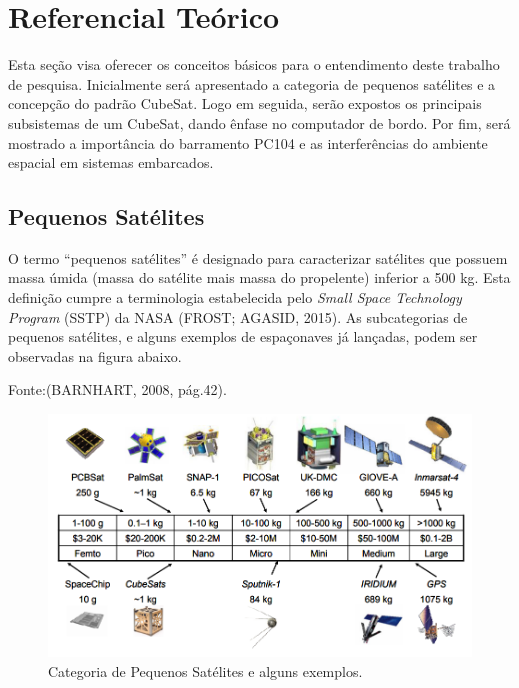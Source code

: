 \chapter[Referencial Teórico]{Referencial Teórico}
\label{referencialTeorico}
Esta seção visa oferecer os conceitos básicos para o entendimento deste trabalho de pesquisa. Inicialmente será apresentado a categoria de pequenos satélites e a concepção do padrão CubeSat. Logo em seguida, serão expostos os principais subsistemas de um CubeSat, dando ênfase no computador de bordo. Por fim, será mostrado a importância do barramento PC104 e as interferências do ambiente espacial em sistemas embarcados.


\section{Pequenos Satélites}

O termo “pequenos satélites” é designado para caracterizar satélites que possuem massa úmida (massa do satélite mais massa do propelente) inferior a 500 kg. Esta definição cumpre a terminologia estabelecida pelo \textit{Small Space Technology Program} (SSTP) da NASA (FROST; AGASID, 2015). As subcategorias de pequenos satélites, e alguns exemplos de espaçonaves já lançadas, podem ser observadas na figura abaixo.

\begin{center}
		\footnotesize{Fonte:(BARNHART, 2008, pág.42).}
\end{center}

\begin{figure}[h]
\footnotesize{	
	\centering

	\includegraphics[keepaspectratio=true,scale=0.55]{figuras/categoria_satellite.PNG}
	\caption{\footnotesize{Categoria de Pequenos Satélites e alguns exemplos.}}
	\label{fig02}
}
\end{figure}
\FloatBarrier

